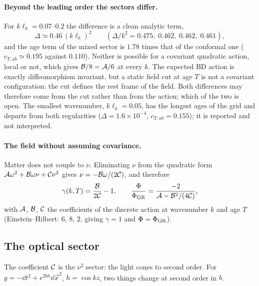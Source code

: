 \paragraph{Beyond the leading order the sectors differ.} For $k\ell_k=0.07$--$0.2$ the difference is a clean
analytic term,
\begin{equation}
  \Delta\simeq0.46\,(k\ell_k)^2\qquad(\Delta/k^2=0.475,\;0.462,\;0.462,\;0.461),
\end{equation}
and the age term of the mixed sector is $1.78$ times that of the conformal one ($c_{T,ab}\simeq0.195$ against
$0.110$). Neither is possible for a covariant quadratic action, local or not, which gives $\mathcal{B}/8=\mathcal{A}/6$ at every
$k$. The expected BD action is exactly diffeomorphism invariant, but a static field cut at age $T$ is not
a covariant configuration: the cut defines the rest frame of the field. Both differences may therefore
come from the cut rather than from the action; which of the two is open. The smallest wavenumber,
$k\ell_k=0.05$, has the longest ages of the grid and departs from both regularities
($\Delta=1.6\times10^{-4}$, $c_{T,ab}=0.155$); it is reported and not interpreted.

\paragraph{The field without assuming covariance.} Matter does not couple to $\nu$. Eliminating $\nu$
from the quadratic form $\mathcal{A}\omega^2+\mathcal{B}\omega\nu+\mathcal{C}\nu^2$ gives $\nu=-\mathcal{B}\omega/(2\mathcal{C})$, and therefore
\begin{equation}\label{eq:gammaABC}
  \gamma(k,T)=\frac{\mathcal{B}}{2\mathcal{C}}-1,\qquad
  \frac{\Phi}{\Phi_{\rm GR}}=\frac{-2}{\mathcal{A}-\mathcal{B}^2/(4\mathcal{C})} ,
\end{equation}
with $\mathcal{A}$, $\mathcal{B}$, $\mathcal{C}$ the coefficients of the discrete action at wavenumber $k$ and age $T$ (Einstein--Hilbert:
$6$, $8$, $2$, giving $\gamma=1$ and $\Phi=\Phi_{\rm GR}$).

\subsection{The optical sector}\label{sec:optical}

The coefficient $\mathcal{C}$ is the $\nu^2$ sector: the light cones to second order. For
$g=-\dd t^2+e^{2bh}\dd\vec x^2$, $h=\cos kz$, two things change at second order in $b$.

